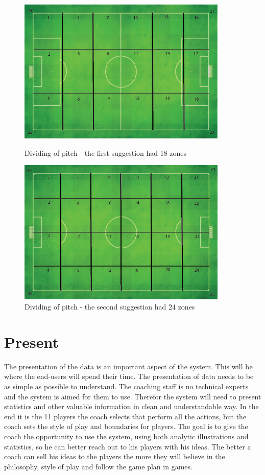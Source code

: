 \begin{figure}[ht!]
\centering
\includegraphics[width=100mm]{images/general/first_zones.png}
\caption{Dividing of pitch - the first suggestion had 18 zones}
\includegraphics[width=100mm]{images/general/second_zones.png}
\caption{Dividing of pitch - the second suggestion had 24 zones}
\label{fig:zones}
\end{figure}

\section{Present}

The presentation of the data is an important aspect of the system. This will be where the end-users will spend their time. The presentation of data needs to be as simple as possible to understand. The coaching staff is no technical experts and the system is aimed for them to use. Therefor the system will need to present statistics and other valuable information in clean and understandable way. In the end it is the 11 players the coach selects that perform all the actions, but the coach sets the style of play and boundaries for players. The goal is to give the coach the opportunity to use the system, using both analytic illustrations and statistics, so he can better reach out to his players with his ideas. The better a coach can sell his ideas to the players the more they will believe in the philosophy, style of play and follow the game plan in games.

